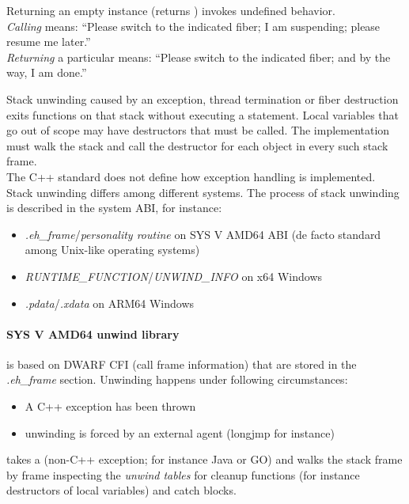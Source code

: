 Returning an empty \fiber instance (\opbool returns ) invokes
undefined behavior.\\

\emph{Calling} \resume means: ``Please switch to the indicated fiber; I
am suspending; please resume me later.''\\

\emph{Returning} a particular \fiber means: ``Please switch to the indicated
fiber; and by the way, I am done.''


\label{unwinding}

Stack unwinding caused by an exception, thread termination or fiber
destruction exits functions on that stack without executing a  statement. Local variables
that go out of scope may have destructors that must be called.
The implementation must walk the stack and call the destructor for each object
in every such stack frame.\\

The C++ standard does not define how exception handling is implemented. Stack unwinding differs
among different systems. The process of stack unwinding is described in the
system ABI, for instance:
\begin{itemize}
    \item \emph{.eh\_frame}/\emph{personality routine} on SYS V AMD64 ABI\cite{SYSVAMD64} (de facto standard among Unix-like operating systems)
    \item \emph{RUNTIME\_FUNCTION}/\emph{UNWIND\_INFO} on x64 Windows\cite{WinX64}
    \item \emph{.pdata}/\emph{.xdata} on ARM64 Windows\cite{WinARM64}
\end{itemize}

\paragraph{SYS V AMD64 unwind library}
is based on DWARF CFI (call frame information) that are stored in the \emph{.eh\_frame} section.
Unwinding happens under following circumstances:
\begin{itemize}
    \item A C++ exception has been thrown
    \item unwinding is forced by an external agent (longjmp for instance)
\end{itemize}
\uwforced takes a \foreignex (non-C++ exception; for instance Java or GO) and walks the stack frame by frame
inspecting the \emph{unwind tables} for cleanup functions (for instance destructors of
local variables) and catch blocks.\\


